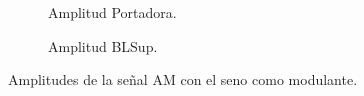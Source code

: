       \begin{figure}[H]
        \centering
        \begin{subfigure}[H]{0.48\textwidth}
          \caption{Amplitud Portadora.}
          \label{fig:AmplitudBLInfAMSeno}
        \end{subfigure}
        \hfill 
        \begin{subfigure}[H]{0.48\textwidth}
          \caption{Amplitud BLSup.}
          \label{fig:AmpltiudBLSupAMSeno}
        \end{subfigure}
      
        \caption{Amplitudes de la señal AM con el seno como modulante.}
        \label{fig:AmplitudesAMSeno}
      \end{figure}


